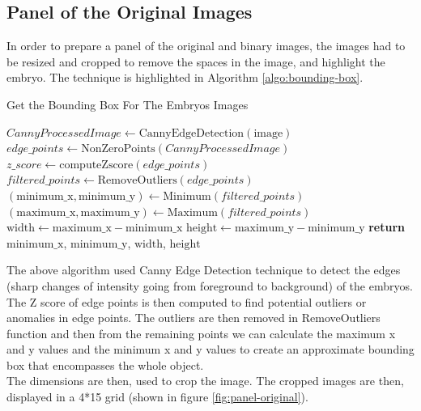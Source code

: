 \documentclass{article}
\begin{document}
\subsection*{Panel of the Original Images}
In order to prepare a panel of the original and binary images, the images had to be resized and cropped to remove the spaces in the image, and highlight the embryo. The technique is highlighted in Algorithm \ref{algo:bounding-box}.  
\begin{algorithm}[h!]
\caption{Get the Bounding Box For The Embryos Images}\label{algo:bounding-box}
\begin{algorithmic}[1]
        \State $CannyProcessedImage \gets \text{CannyEdgeDetection}(\text{image})$
        \State $edge\_points \gets \text{NonZeroPoints}(CannyProcessedImage)$
        \State $z\_score \gets \text{computeZscore}(edge\_points)$
        \State $filtered\_points \gets \text{RemoveOutliers}(edge\_points)$
        \State $(\text{minimum\_x}, \text{minimum\_y}) \gets \text{Minimum}(filtered\_points)$
        \State $(\text{maximum\_x}, \text{maximum\_y}) \gets \text{Maximum}(filtered\_points)$
    \EndFor
    \State $\text{width} \gets \text{maximum\_x} - \text{minimum\_x}$
    \State $\text{height} \gets \text{maximum\_y} - \text{minimum\_y}$
    \State \textbf{return} $\text{minimum\_x}$, $\text{minimum\_y}$, $\text{width}$, $\text{height}$ 
\EndProcedure
\end{algorithmic}
\end{algorithm}

The above algorithm used Canny Edge Detection technique to detect the edges (sharp changes of intensity going from foreground to background) of the embryos. The Z score of edge points is then computed to find potential outliers or anomalies in edge points. The outliers are then removed in RemoveOutliers function and then from the remaining points  we can calculate the maximum x and y values and the minimum x and y values to create an approximate bounding box that encompasses the whole object. \\The dimensions are then, used to crop the image. The cropped images are then, displayed in a 4*15 grid (shown in figure \ref{fig:panel-original}). 
\end{document}
